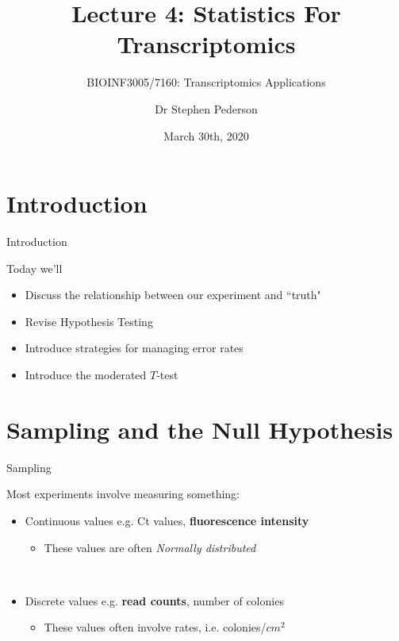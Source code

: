\documentclass[aspectratio=169,11pt]{beamer}
\author{Dr Stephen Pederson}
\title{Lecture 4: Statistics For Transcriptomics}
\subtitle{BIOINF3005/7160: Transcriptomics Applications}
\institute{Bioinformatics Hub, \\The University of Adelaide}
\date{March 30th, 2020}
\begin{document}
\begin{frame}
\titlepage
\end{frame}

\begin{frame}
\footnotesize
\tableofcontents
\end{frame}

\section{Introduction}

\begin{frame}{Introduction}

Today we'll 

	\begin{itemize}
		\item Discuss the relationship between our experiment and ``truth"
		\item Revise Hypothesis Testing
		\item Introduce strategies for managing error rates
		\item Introduce the moderated $T$-test
	\end{itemize}

\end{frame}	


\section{Sampling and the Null Hypothesis}


\begin{frame}{Sampling}

	Most experiments involve measuring something:\\[5mm]

	\begin{itemize}
		\item Continuous values e.g. Ct values, \textbf{fluorescence intensity}
		\begin{itemize}
			\item These values are often \textit{Normally distributed}
		\end{itemize}
		~\\[2mm]
	\pause
		\item Discrete values e.g. \textbf{read counts}, number of colonies
		\begin{itemize}
			\item These values often involve rates, i.e. colonies/$cm^2$
		\end{itemize}

	\end{itemize}

\end{frame}
\end{document}
